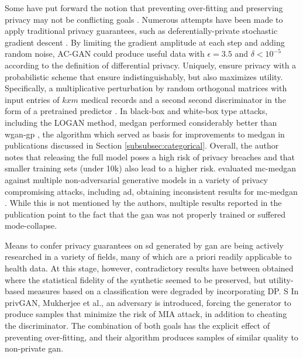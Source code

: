         Some have put forward the notion that preventing over-fitting and preserving privacy may not be conflicting goals \cite{Wu2019-ui,Mukherjee2019-vu}. Numerous attempts have been made to apply traditional privacy guarantees, such as deferentially-private stochastic gradient descent \cite{Beaulieu-Jones2019-ct, esteban2017real,chincheong2020generation, BaeAnomiGAN2020}. By limiting the gradient amplitude at each step and adding random noise, AC-GAN could produce useful data with $\epsilon=3.5$ and $\delta<10^{-5}$ according to the definition of differential privacy. Uniquely, \citeauthor{BaeAnomiGAN2020} ensure privacy with a probabilistic scheme that ensure indistinguishably, but also maximizes utility. Specifically, a multiplicative perturbation by random orthogonal matrices with input entries of $k x m$ medical records and a second second discriminator in the form of a pretrained predictor \cite{BaeAnomiGAN2020}. In black-box and white-box type attacks, including the LOGAN \cite{hayes2017logan} method, \gls{medgan} performed considerably better than \gls{wgan-gp} \cite{chen2019ganleaks}, the algorithm which served as basis for improvements to \gls{medgan} in publications discussed in Section \ref{subsubsec:categorical}. Overall, the author notes that releasing the full model poses a high risk of privacy breaches and that smaller training sets (under 10k) also lead to a higher risk. \citeauthor{Goncalves2020} evaluated \gls{mc-medgan} against multiple non-adversarial generative models in a variety of privacy compromising attacks, including \gls{ad}, obtaining inconsistent results for \gls{mc-medgan} \cite{Goncalves2020}. While this is not mentioned by the authors, multiple results reported in the publication point to the fact that the \gls{gan} was not properly trained or suffered mode-collapse.\par
        
        Means to confer privacy guarantees on \gls{sd} generated by \gls{gan} are being actively researched in a variety of fields, many of which are a priori readily applicable to health data. At this stage, however, contradictory results have between obtained where the statistical fidelity of the synthetic seemed to be preserved, but utility-based measures based on a classification were degraded by incorporating DP. S In privGAN, Mukherjee et al., an adversary is introduced, forcing the generator to produce samples that minimize the risk of MIA attack, in addition to cheating the discriminator. The combination of both goals has the explicit effect of preventing over-fitting, and their algorithm produces samples of similar quality to non-private \gls{gan}.\par
    
